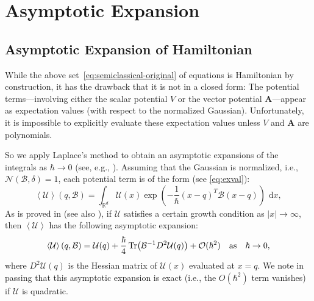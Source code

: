 \documentclass[10pt]{article}
\newcommand{\vect}[1]{\boldsymbol{#1}}
\begin{document}
\section{Asymptotic Expansion}
\subsection{Asymptotic Expansion of Hamiltonian}
\label{ssec:asymptotic_expansion}
While the above set~\eqref{eq:semiclassical-original} of equations is Hamiltonian by construction, it has the drawback that it is not in a closed form: The potential terms---involving either the scalar potential $V$ or the vector potential $\vect{A}$---appear as expectation values (with respect to the normalized Gaussian).
Unfortunately, it is impossible to explicitly evaluate these expectation values unless $V$ and $\vect{A}$ are polynomials.

So we apply Laplace's method to obtain an asymptotic expansions of the integrals as $\hbar \to 0$ (see, e.g., \citet[Chapter~3]{Mi2006}).
Assuming that the Gaussian is normalized, i.e., $\mathcal{N}(\mathcal{B},\delta) = 1$, each potential term is of the form (see \eqref{eq:exval}):
\begin{equation}
  \label{eq:exval-normalized}
  \left\langle \mathcal{U} \right\rangle(q,\mathcal{B}) = \int_{\mathbb{R}^d} \mathcal{U}(x) \exp\left( -\frac{1}{\hbar} (x-q)^T \mathcal{B} (x-q) \right) \text{ d}x,
\end{equation}
As is proved in \citet[Proposition~7.1]{OhLe2013} (see also \citet[Section 3.7]{Mi2006}), if $\mathcal{U}$ satisfies a certain growth condition as $|x| \to \infty$, then $\left\langle \mathcal{U}\right\rangle$ has the following asymptotic expansion:
\begin{equation}
  \label{eq:asymptotic_expansion}
  \left\langle\mathcal{U}\right\rangle(q,\mathcal{B}) = \mathcal{U}(q) + \frac{\hbar}{4} \Tr( \mathcal{B}^{-1} D^2 \mathcal{U}(q))  + \mathcal{O}(\hbar^2) \quad \text{as} \quad \hbar \rightarrow 0,
\end{equation}
where $D^2 \mathcal{U}(q)$ is the Hessian matrix of $\mathcal{U}(x)$ evaluated at $x = q$.
We note in passing that this asymptotic expansion is exact (i.e., the $O(\hbar^{2})$ term vanishes) if $\mathcal{U}$ is quadratic.
\end{document}
